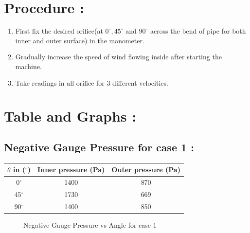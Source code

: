 \documentclass[12pt,a4paper]{article}
\begin{document}
\section{Procedure :}
\begin{enumerate}
    \item First fix the desired orifice(at $0^{\circ},45^{\circ}$ and $90^{\circ}$ across the bend of pipe for both inner and outer surface)  in the manometer.
    \item Gradually increase the speed of wind flowing inside after starting the machine.
    \item Take readings in all orifice for 3 different velocities.
\end{enumerate}






\section{Table and Graphs :}

\subsection{Negative Gauge Pressure for case 1 :}
 
\begin{center}
\begin{tabular}{ |c|c|c| } 
 \hline
 \textbf{$\theta$ in ($^{\circ}$)} & \textbf{Inner pressure (Pa)} & \textbf{Outer pressure (Pa)} \\ 
 \hline
0$^{\circ}$ & 1400 & 870 \\ 
 \hline
 45$^{\circ}$ & 1730 & 669 \\ 
 \hline
90$^{\circ}$ & 1400 & 850 \\ 
 \hline
\end{tabular}
\end{center}
\begin{figure}[!ht]
	\begin{center}
	\end{center}
	\caption{Negative Gauge Pressure vs Angle for case 1}
\end{figure}
\newpage
\end{document}
